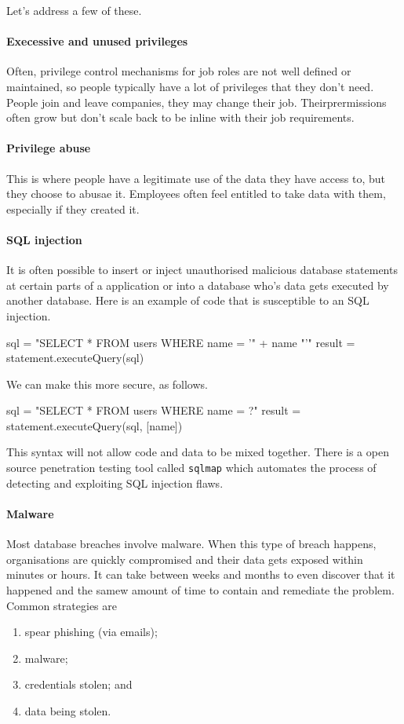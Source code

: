 Let's address a few of these.

\paragraph{Execessive and unused privileges} Often, privilege control mechanisms for job roles are not well defined or maintained, so people typically have a lot of privileges that they don't need. People join and leave companies, they may change their job. Theirprermissions often grow but don't scale back to be inline with their job requirements.

\paragraph{Privilege abuse} This is where people have a legitimate use of the data they have access to, but they choose to abusae it. Employees often feel entitled to take data with them, especially if they created it. 

\paragraph{SQL injection} It is often possible to insert or inject unauthorised malicious database statements at certain parts of a application or into a database who's data gets executed by another database. Here is an example of code that is susceptible to an SQL injection.
\begin{center}
    \ttfamily
    sql = "SELECT * FROM users WHERE name = '" + name "'"
    result = statement.executeQuery(sql)
\end{center}
We can make this more secure, as follows.
\begin{center}
    \ttfamily
    sql = "SELECT * FROM users WHERE name = ?"
    result = statement.executeQuery(sql, [name])
\end{center}
This syntax will not allow code and data to be mixed together. There is a open source penetration testing tool called \texttt{sqlmap} which automates the process of detecting and exploiting SQL injection flaws.

\paragraph{Malware} Most database breaches involve malware. When this type of breach happens, organisations are quickly compromised and their data gets exposed within minutes or hours. It can take between weeks and months to even discover that it happened and the samew amount of time to contain and remediate the problem. Common strategies are
\begin{enumerate}
    \item spear phishing (via emails);
    \item malware;
    \item credentials stolen; and
    \item data being stolen.
\end{enumerate}

